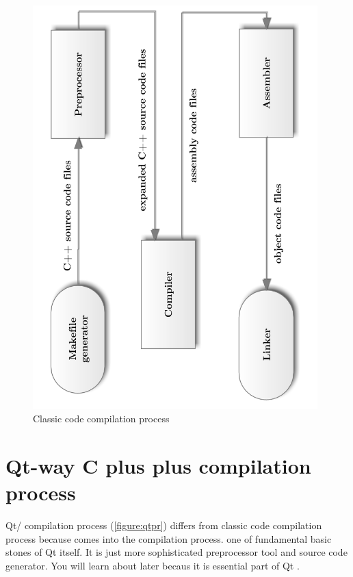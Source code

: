\begin{figure}[ht]
\centering
\includegraphics[angle=-90,width=11cm]{graphics/laboratory/09-classiccomp.pdf}
\caption{Classic \cpp{} code compilation process}\label{figure:classicpr}
\end{figure}

\section{Qt-way C plus plus compilation process}
Qt/\cpp{} compilation process (\autoref{figure:qtpr}) differs from classic \cpp{} code compilation process because  comes into the compilation process.  one of fundamental basic stones of Qt itself. It is just more sophisticated preprocessor tool and source code generator. You will learn about  later becaus it is essential part of Qt .

